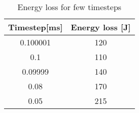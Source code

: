 \begin {table}[htb!]
\begin{center}
\begin{tabular}{| c| c|}
\hline
{\bf Timestep[ms]} & {\bf Energy loss [J]}\\  \hline
 0.100001 &  120 \\ \hline
 0.1 &  110 \\ \hline
 0.09999 &  140 \\ \hline
 0.08 &  170 \\ \hline
 0.05 &  215 \\ \hline
\end {tabular}
\end{center}
\caption {Energy loss for few timesteps} \label{tab:ep2ts} 
\end {table}


\cleardoublepage
